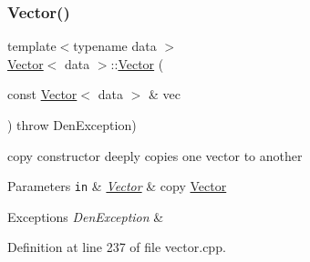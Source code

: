 \subsubsection{\texorpdfstring{Vector()}{Vector()}\hspace{0.1cm}{\footnotesize\ttfamily [4/5]}}
{\footnotesize\ttfamily template$<$typename data $>$ \\
\hyperlink{classVector}{Vector}$<$ data $>$\+::\hyperlink{classVector}{Vector} (\begin{DoxyParamCaption}\item[{const \hyperlink{classVector}{Vector}$<$ data $>$ \&}]{vec }\end{DoxyParamCaption}) throw  Den\+Exception) }



copy constructor  deeply copies one vector to another 


\begin{DoxyParams}[1]{Parameters}
\mbox{\tt in}  & {\em \hyperlink{classVector}{Vector}} & copy \hyperlink{classVector}{Vector} \\
\hline
\end{DoxyParams}

\begin{DoxyExceptions}{Exceptions}
{\em Den\+Exception} & \\
\hline
\end{DoxyExceptions}


Definition at line 237 of file vector.\+cpp.



